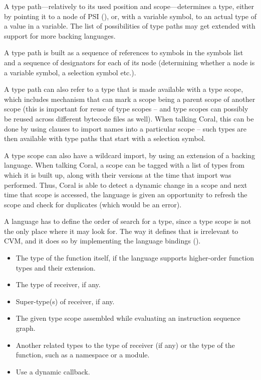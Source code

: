 A type path---relatively to its used position and scope---determines a type, either by pointing it to a node of PSI (), or, with a variable symbol, to an actual type of a value in a variable. The list of possibilities of type paths may get extended with support for more backing languages. 

A type path is built as a sequence of references to symbols in the symbols list and a sequence of designators for each of its node (determining whether a node is a variable symbol, a selection symbol etc.).

A type path can also refer to a type that is made available with a type scope, which includes mechanism that can mark a scope being a parent scope of another scope (this is important for reuse of type scopes -- and type scopes can possibly be reused across different bytecode files as well). When talking Coral, this can be done by using  clauses to import names into a particular scope -- such types are then available with type paths that start with a selection symbol. 

A type scope can also have a wildcard import, by using an extension of a backing language. When talking Coral, a scope can be tagged with a list of types from which it is built up, along with their versions at the time that import was performed. Thus, Coral is able to detect a dynamic change in a scope and next time that scope is accessed, the language is given an opportunity to refresh the scope and check for duplicates (which would be an error). 

A language has to define the order of search for a type, since a type scope is not the only place where it may look for. The way it defines that is irrelevant to CVM, and it does so by implementing the language bindings (). 

\begin{itemize}
\item The type of the function itself, if the language supports higher-order function types and their extension. 
\item The type of receiver, if any. 
\item Super-type(s) of receiver, if any. 
\item The given type scope assembled while evaluating an instruction sequence graph. 
\item Another related types to the type of receiver (if any) or the type of the function, such as a namespace or a module. 
\item Use a dynamic callback. 
\end{itemize}

